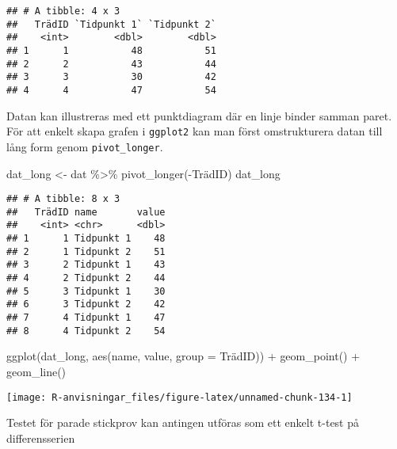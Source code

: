 \documentclass[
]{book}
\newenvironment{Shaded}{\begin{snugshade}}{\end{snugshade}}
\newcommand{\AttributeTok}[1]{\textcolor[rgb]{0.77,0.63,0.00}{#1}}
\newcommand{\FunctionTok}[1]{\textcolor[rgb]{0.00,0.00,0.00}{#1}}
\newcommand{\NormalTok}[1]{#1}
\newcommand{\OtherTok}[1]{\textcolor[rgb]{0.56,0.35,0.01}{#1}}
\newcommand{\SpecialCharTok}[1]{\textcolor[rgb]{0.00,0.00,0.00}{#1}}
\newcommand{\StringTok}[1]{\textcolor[rgb]{0.31,0.60,0.02}{#1}}
\theoremstyle{definition}
\theoremstyle{definition}
\theoremstyle{definition}
\theoremstyle{definition}
\theoremstyle{remark}
\begin{document}
\begin{verbatim}
## # A tibble: 4 x 3
##   TrädID `Tidpunkt 1` `Tidpunkt 2`
##    <int>        <dbl>        <dbl>
## 1      1           48           51
## 2      2           43           44
## 3      3           30           42
## 4      4           47           54
\end{verbatim}

Datan kan illustreras med ett punktdiagram där en linje binder samman paret. För att enkelt skapa grafen i \texttt{ggplot2} kan man först omstrukturera datan till lång form genom \texttt{pivot\_longer}.

\begin{Shaded}
\begin{Highlighting}[]
\NormalTok{dat\_long }\OtherTok{\textless{}{-}}\NormalTok{ dat }\SpecialCharTok{\%\textgreater{}\%} \FunctionTok{pivot\_longer}\NormalTok{(}\SpecialCharTok{{-}}\NormalTok{TrädID)}
\NormalTok{dat\_long}
\end{Highlighting}
\end{Shaded}

\begin{verbatim}
## # A tibble: 8 x 3
##   TrädID name       value
##    <int> <chr>      <dbl>
## 1      1 Tidpunkt 1    48
## 2      1 Tidpunkt 2    51
## 3      2 Tidpunkt 1    43
## 4      2 Tidpunkt 2    44
## 5      3 Tidpunkt 1    30
## 6      3 Tidpunkt 2    42
## 7      4 Tidpunkt 1    47
## 8      4 Tidpunkt 2    54
\end{verbatim}

\begin{Shaded}
\begin{Highlighting}[]
\FunctionTok{ggplot}\NormalTok{(dat\_long, }\FunctionTok{aes}\NormalTok{(name, value, }\AttributeTok{group =}\NormalTok{ TrädID)) }\SpecialCharTok{+}
  \FunctionTok{geom\_point}\NormalTok{() }\SpecialCharTok{+}
  \FunctionTok{geom\_line}\NormalTok{()}
\end{Highlighting}
\end{Shaded}

\begin{center}\texttt{[image: R-anvisningar\_files/figure-latex/unnamed-chunk-134-1]} \end{center}

Testet för parade stickprov kan antingen utföras som ett enkelt t-test på differensserien

\begin{Shaded}
\end{Shaded}
\end{document}
